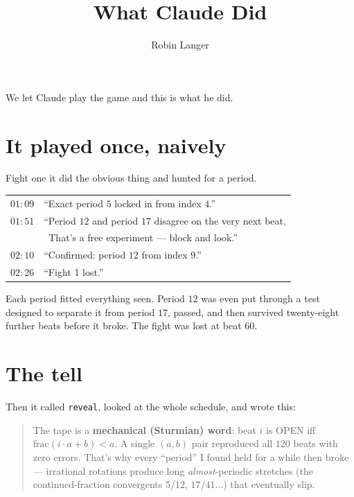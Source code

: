 \documentclass[11pt,a4paper]{article}
\title{What Claude Did}
\author{Robin Langer}
\date{}
\newcommand{\code}[1]{\texttt{\small #1}}
\begin{document}
\maketitle
\vspace{-2em}

We let Claude play the game and this is what he did.

\section{It played once, naively}

Fight one it did the obvious thing and hunted for a period.

\begin{center}
\begin{tabular}{ll}
\toprule
$01{:}09$ & ``Exact period $5$ locked in from index $4$.'' \\
$01{:}51$ & ``Period $12$ and period $17$ disagree on the very next beat. \\
          & \ That's a free experiment --- block and look.'' \\
$02{:}10$ & ``Confirmed: period $12$ from index $9$.'' \\
$02{:}26$ & ``Fight 1 lost.'' \\
\bottomrule
\end{tabular}
\end{center}

Each period fitted everything seen. Period $12$ was even put through a test
designed to separate it from period $17$, passed, and then survived twenty-eight
further beats before it broke. The fight was lost at beat $60$.

\section{The tell}

Then it called \code{reveal}, looked at the whole schedule, and wrote this:

\begin{quote}
The tape is a \textbf{mechanical (Sturmian) word}: beat $i$ is OPEN iff
$\mathrm{frac}(i \cdot a + b) < a$. A single $(a,b)$ pair reproduced all $120$
beats with zero errors. That's why every ``period'' I found held for a while
then broke --- irrational rotations produce long \emph{almost}-periodic
stretches (the continued-fraction convergents $5/12$, $17/41 \ldots$) that
eventually slip.
\end{quote}
\end{document}
